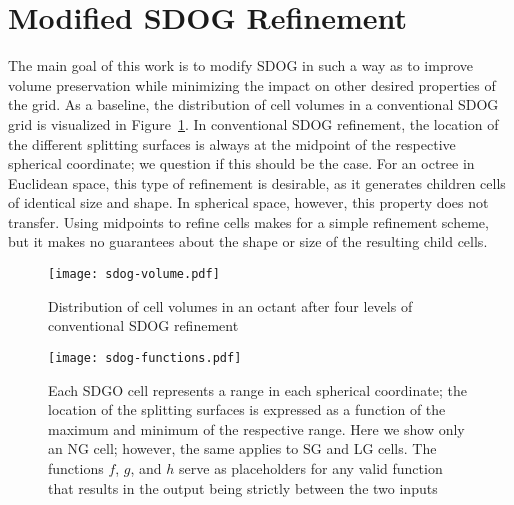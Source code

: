 \section{Modified SDOG Refinement} \label{chap:4:modified}
The main goal of this work is to modify SDOG in such a way as to improve volume preservation while minimizing the impact on other desired properties of the grid.
As a baseline, the distribution of cell volumes in a conventional SDOG grid is visualized in Figure~\ref{fig:sdog-volume}.
In conventional SDOG refinement, the location of the different splitting surfaces is always at the midpoint of the respective spherical coordinate; we question if this should be the case.
For an octree in Euclidean space, this type of refinement is desirable, as it generates children cells of identical size and shape.
In spherical space, however, this property does not transfer.
Using midpoints to refine cells makes for a simple refinement scheme, but it makes no guarantees about the shape or size of the resulting child cells.


\begin{figure}[ht!]
	\centering
	\texttt{[image: sdog-volume.pdf]}
	\caption[Distribution of cell volumes in SDOG]{
		Distribution of cell volumes in an octant after four levels of conventional SDOG refinement
	}
	\label{fig:sdog-volume}
\end{figure}


\begin{figure}[ht!]
	\centering
	\texttt{[image: sdog-functions.pdf]}
	\caption[How functions determine the location of SDOG splitting surfaces]{
		Each SDGO cell represents a range in each spherical coordinate; the location of the splitting surfaces is expressed as a function of the maximum and minimum of the respective range.
		Here we show only an NG cell; however, the same applies to SG and LG cells.
		The functions $f$, $g$, and $h$ serve as placeholders for any valid function that results in the output being strictly between the two inputs
	}
	\label{fig:functions}
\end{figure}


